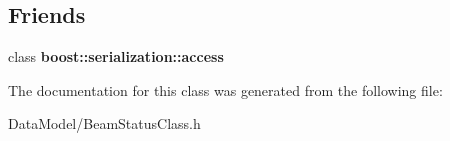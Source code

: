 \subsection*{Friends}
\begin{DoxyCompactItemize}
\item 
\hypertarget{classBeamStatusClass_ac98d07dd8f7b70e16ccb9a01abf56b9c}{class {\bfseries boost\-::serialization\-::access}}\label{classBeamStatusClass_ac98d07dd8f7b70e16ccb9a01abf56b9c}

\end{DoxyCompactItemize}


The documentation for this class was generated from the following file\-:\begin{DoxyCompactItemize}
\item 
Data\-Model/Beam\-Status\-Class.\-h\end{DoxyCompactItemize}
